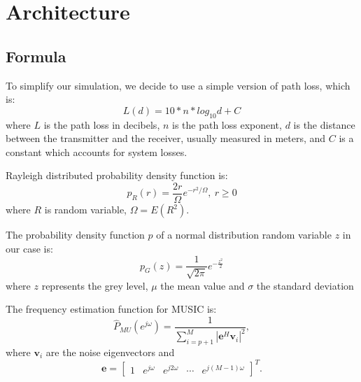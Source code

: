 \section{Architecture}
\subsection{Formula}
To simplify our simulation, we decide to use a simple version of path loss, which is:
\begin{equation}
L(d)=10*n*log_{10}d + C
\end{equation}
where $L$ is the path loss in decibels, $n$ is the path loss exponent, $d$ is the distance between the transmitter and the receiver, usually measured in meters, and $C$ is a constant which accounts for system losses.
\vspace{1cm}
\par
Rayleigh distributed probability density function is:
\begin{equation}
p_{R}(r)={\frac {2r}{\Omega }}e^{-r^{2}/\Omega },\ r\geq {}0
\end{equation}
where $R$ is random variable, $\Omega = E(R^{2})$.
\vspace{1cm}
\par
The probability density function $p$ of a normal distribution random variable $z$ in our case is:
\begin{equation}
p_{G}(z)={\frac {1}{ {\sqrt {2\pi }}}}e^{-{\frac {z^{2}}{2}}}
\end{equation}
where $z$ represents the grey level, $\mu$  the mean value and $\sigma$  the standard deviation
\vspace{1cm}
\par
The frequency estimation function for MUSIC is:
\begin{equation}
\hat P_{MU}(e^{j \omega}) = \frac{1}{\sum_{i=p+1}^{M} |\mathbf{e}^{H} \mathbf{v}_i|^2},
\end{equation}
where $\mathbf{v}_i$ are the noise eigenvectors and
\begin{equation}
\mathbf{e} = \begin{bmatrix}1 & e^{j \omega} & e^{j 2 \omega} & \cdots & e^{j (M-1) \omega}\end{bmatrix}^T.
\end{equation}
